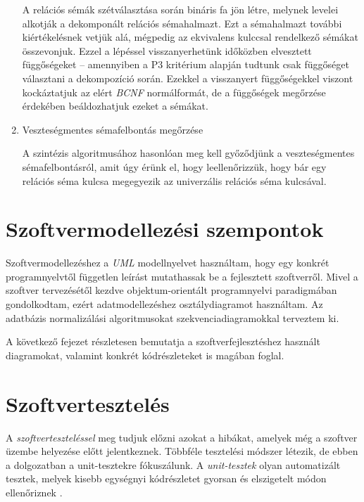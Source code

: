 \begin{enumerate}
A relációs sémák szétválasztása során bináris fa jön létre, melynek levelei alkotják a dekomponált relációs sémahalmazt. Ezt a sémahalmazt további kiértékelésnek vetjük alá, mégpedig az ekvivalens kulccsal rendelkező sémákat összevonjuk. Ezzel a lépéssel visszanyerhetünk időközben elvesztett függőségeket – amennyiben a P3 kritérium alapján tudtunk csak függőséget választani a dekompozíció során. Ezekkel a visszanyert függőségekkel viszont kockáztatjuk az elért \textit{BCNF} normálformát, de a függőségek megőrzése érdekében beáldozhatjuk ezeket a sémákat. 
	
	\item Veszteségmentes sémafelbontás megőrzése
	
A szintézis algoritmusához hasonlóan meg kell győződjünk a veszteségmentes sémafelbontásról, amit úgy érünk el, hogy leellenőrizzük, hogy bár egy relációs séma kulcsa megegyezik az univerzális relációs séma kulcsával.
    
\end{enumerate}

\section{Szoftvermodellezési szempontok}

Szoftvermodellezéshez a \textit{UML}  modellnyelvet használtam, hogy egy konkrét programnyelvtől független leírást mutathassak be a fejlesztett szoftverről. Mivel a szoftver tervezésétől kezdve objektum-orientált programnyelvi paradigmában gondolkodtam, ezért adatmodellezéshez osztálydiagramot használtam. Az adatbázis normalizálási algoritmusokat szekvenciadiagramokkal terveztem ki.

A következő fejezet részletesen bemutatja a szoftverfejlesztéshez használt diagramokat, valamint konkrét kódrészleteket is magában foglal.

\section{Szoftvertesztelés}

A \textit{szoftverteszteléssel}  meg tudjuk előzni azokat a hibákat, amelyek még a szoftver üzembe helyezése előtt jelentkeznek. Többféle tesztelési módszer létezik, de ebben a dolgozatban a unit-tesztekre fókuszálunk. A \textit{unit-tesztek}  olyan automatizált tesztek, melyek kisebb egységnyi kódrészletet gyorsan és elszigetelt módon ellenőriznek \parencite{khorikov2020}.

